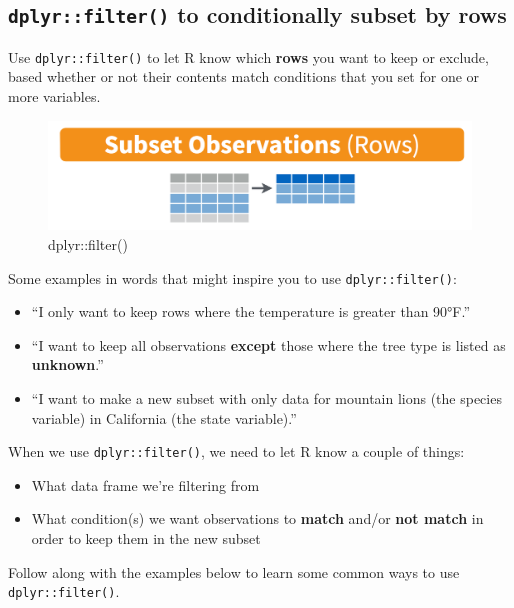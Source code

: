 \documentclass[]{book}
\providecommand{\tightlist}{%
  \setlength{\itemsep}{0pt}\setlength{\parskip}{0pt}}
\begin{document}
\hypertarget{dplyrfilter-to-conditionally-subset-by-rows}{%
\subsection{\texorpdfstring{\texttt{dplyr::filter()} to conditionally subset by rows}{dplyr::filter() to conditionally subset by rows}}\label{dplyrfilter-to-conditionally-subset-by-rows}}

Use \texttt{dplyr::filter()} to let R know which \textbf{rows} you want to keep or exclude, based whether or not their contents match conditions that you set for one or more variables.

\begin{figure}
\centering
\includegraphics{img/rstudio-cheatsheet-filter.png}
\caption{dplyr::filter()}
\end{figure}

Some examples in words that might inspire you to use \texttt{dplyr::filter()}:

\begin{itemize}
\tightlist
\item
  ``I only want to keep rows where the temperature is greater than 90°F.''
\item
  ``I want to keep all observations \textbf{except} those where the tree type is listed as \textbf{unknown}.''
\item
  ``I want to make a new subset with only data for mountain lions (the species variable) in California (the state variable).''
\end{itemize}

When we use \texttt{dplyr::filter()}, we need to let R know a couple of things:

\begin{itemize}
\tightlist
\item
  What data frame we're filtering from
\item
  What condition(s) we want observations to \textbf{match} and/or \textbf{not match} in order to keep them in the new subset
\end{itemize}

Follow along with the examples below to learn some common ways to use \texttt{dplyr::filter()}.
\end{document}
